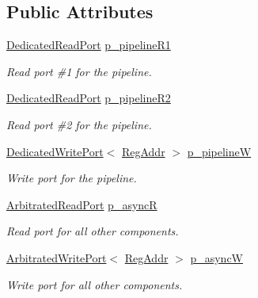 \subsection*{Public Attributes}
\begin{DoxyCompactItemize}
\item 
\hyperlink{class_simulator_1_1_dedicated_read_port}{Dedicated\+Read\+Port} \hyperlink{class_simulator_1_1drisc_1_1_register_file_a27f622eaade2cd9091b373e4edb24e41}{p\+\_\+pipeline\+R1}
\begin{DoxyCompactList}\small\item\em Read port \#1 for the pipeline. \end{DoxyCompactList}\item 
\hyperlink{class_simulator_1_1_dedicated_read_port}{Dedicated\+Read\+Port} \hyperlink{class_simulator_1_1drisc_1_1_register_file_afd0962c8b4612df006247a1c6003a80f}{p\+\_\+pipeline\+R2}
\begin{DoxyCompactList}\small\item\em Read port \#2 for the pipeline. \end{DoxyCompactList}\item 
\hyperlink{class_simulator_1_1_dedicated_write_port}{Dedicated\+Write\+Port}$<$ \hyperlink{struct_simulator_1_1_reg_addr}{Reg\+Addr} $>$ \hyperlink{class_simulator_1_1drisc_1_1_register_file_a590c9d875284b49a33f44dec3c99422e}{p\+\_\+pipeline\+W}
\begin{DoxyCompactList}\small\item\em Write port for the pipeline. \end{DoxyCompactList}\item 
\hyperlink{class_simulator_1_1_arbitrated_read_port}{Arbitrated\+Read\+Port} \hyperlink{class_simulator_1_1drisc_1_1_register_file_ab5b6ece9e724537c995b59afa274967c}{p\+\_\+async\+R}
\begin{DoxyCompactList}\small\item\em Read port for all other components. \end{DoxyCompactList}\item 
\hyperlink{singleton_simulator_1_1_arbitrated_write_port}{Arbitrated\+Write\+Port}$<$ \hyperlink{struct_simulator_1_1_reg_addr}{Reg\+Addr} $>$ \hyperlink{class_simulator_1_1drisc_1_1_register_file_a7adb708606bceb4b22dffe33a0563278}{p\+\_\+async\+W}
\begin{DoxyCompactList}\small\item\em Write port for all other components. \end{DoxyCompactList}\end{DoxyCompactItemize}
